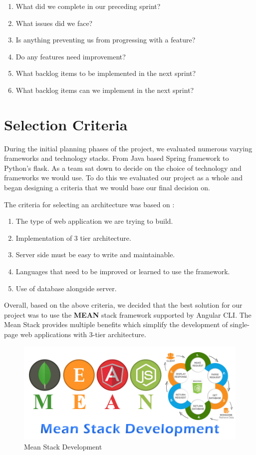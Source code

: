\begin{enumerate}
  \item What did we complete in our preceding sprint?
  \item What issues did we face?
  \item Is anything preventing us from progressing with a feature?
  \item Do any features need improvement?
  \item What backlog items to be implemented in the next sprint?
  \item What backlog items can we implement in the next sprint?
\end{enumerate}

\section{Selection Criteria}
During the initial planning phases of the project, we evaluated numerous varying frameworks and technology stacks. From Java based Spring framework to Python's flask. As a team sat down to decide on the choice of technology and frameworks we would use. To do this we evaluated our project as a whole and began designing a criteria that we would base our final decision on. 

The criteria for selecting an architecture was based on :
\begin{enumerate}
  \item The type of web application we are trying to build.
  \item Implementation of 3 tier architecture.
  \item Server side must be easy to write and maintainable.
  \item Languages that need to be improved or learned to use the framework.
  \item Use of database alongside server.
\end{enumerate}
Overall, based on the above criteria, we decided that the best solution for our project was to use the \textbf{MEAN} stack framework supported by Angular CLI. The Mean Stack provides multiple benefits which simplify the development of single-page web applications with 3-tier architecture. 

\begin{figure}[H]
  \includegraphics[width=\linewidth]{img/msd.png}
  \caption{Mean Stack Development}
  \label{fig:mena-stack}
\end{figure}

